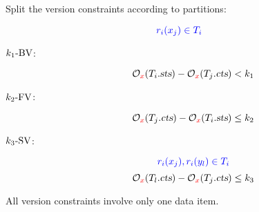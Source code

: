 \begin{frame}{}
  Split the \rvsi{} version constraints according to partitions:

  \[
    \textcolor{blue}{r_i(x_j) \in T_i}
  \]
  \vspace{-0.40cm}
  \begin{description}
    \item[$k_1\text{-BV}$:]
      \[
	\mathcal{O}_{\textcolor{red}{x}}(T_i.\textsl{sts}) - \mathcal{O}_{\textcolor{red}{x}}(T_j.\textsl{cts}) < k_1
      \]
    \item[$k_2\text{-FV}$:]
      \[
	\mathcal{O}_{\textcolor{red}{x}}(T_j.\textsl{cts}) - \mathcal{O}_{\textcolor{red}{x}}(T_i.\textsl{sts}) \le k_2
      \]
    \item[$k_3\text{-SV}$:]
      \[
	\textcolor{blue}{r_i(x_j), r_i(y_l) \in T_i}
      \]
      \vspace{-0.40cm}
      \[
	\mathcal{O}_{\textcolor{red}{x}}(T_l.\textsl{cts}) - \mathcal{O}_{\textcolor{red}{x}}(T_j.\textsl{cts}) \le k_3
      \]
  \end{description}

  \vspace{0.6cm}
  \centerline{All version constraints involve only one data item.}
\end{frame}

\begin{frame}{}
  \begin{center}
    \begin{minipage}{1.0\textwidth}
      
    \end{minipage}
  \end{center}
\end{frame}

\begin{frame}{}
  \begin{center}
    \begin{minipage}{1.0\textwidth}
      
    \end{minipage}
  \end{center}
\end{frame}

\begin{frame}{}
  \begin{center}
  \end{center}
\end{frame}

\begin{frame}{}
  \begin{center}
    \begin{minipage}{1.0\textwidth}
      
    \end{minipage}
  \end{center}
\end{frame}

\begin{frame}{}
\end{frame}
